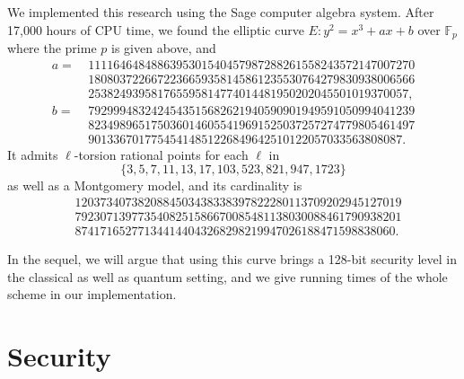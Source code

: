 \documentclass{article}
\newcommand{\F}{\mathbb{F}}
\theoremstyle{definition}
\begin{document}
We implemented this research using the Sage computer algebra system.
After 17,000 hours of CPU time, we found the elliptic curve
$
	E : y^2 = x^3 + ax + b
$
over $\F_p$ where the prime $p$ is given above, and
\[
\begin{aligned}
a =\ & 1111646484886395301540457987288261558243572147007270 \\ 
& 1808037226672236659358145861235530764279830938006566 \\
& 253824939581765595814774014481950202045501019370057,\\
b =\ & 7929994832424543515682621940590901949591050994041239 \\
& 8234989651750360146055419691525037257274779805461497 \\ 
& 90133670177545414851226849642510122057033563808087.
\end{aligned}
\]
It admits $\ell$-torsion rational points for each $\ell$ in
\[
  \{3, 5, 7, 11, 13, 17, 103, 523, 821, 947, 1723\}
\]
as well as a Montgomery model, and its cardinality is
\[
\begin{aligned}
& 1203734073820884503438338397822280113709202945127019 \\ 
& 7923071397735408251586670085481138030088461790938201 \\
& 874171652771344144043268298219947026188471598838060.
\end{aligned}
\]

In the sequel, we will argue that using this curve brings a 128-bit security level
in the classical as well as quantum setting, and we give running times of the whole
scheme in our implementation.

\section{Security}
\label{sec:sec}


\end{document}
